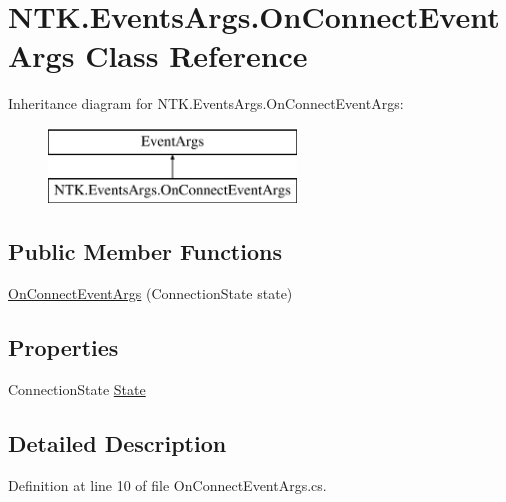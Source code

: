\hypertarget{class_n_t_k_1_1_events_args_1_1_on_connect_event_args}{}\section{N\+T\+K.\+Events\+Args.\+On\+Connect\+Event\+Args Class Reference}
\label{class_n_t_k_1_1_events_args_1_1_on_connect_event_args}
Inheritance diagram for N\+T\+K.\+Events\+Args.\+On\+Connect\+Event\+Args\+:\begin{figure}[H]
\begin{center}
\leavevmode
\includegraphics[height=2.000000cm]{d4/d56/class_n_t_k_1_1_events_args_1_1_on_connect_event_args}
\end{center}
\end{figure}
\subsection*{Public Member Functions}
\begin{DoxyCompactItemize}
\item 
\mbox{\hyperlink{class_n_t_k_1_1_events_args_1_1_on_connect_event_args_a8ee12a801fa6e27a3426cdfd44fd433b}{On\+Connect\+Event\+Args}} (Connection\+State state)
\end{DoxyCompactItemize}
\subsection*{Properties}
\begin{DoxyCompactItemize}
\item 
Connection\+State \mbox{\hyperlink{class_n_t_k_1_1_events_args_1_1_on_connect_event_args_a0ef5c46529b6983eef215ac3218fa488}{State}}
\end{DoxyCompactItemize}


\subsection{Detailed Description}


Definition at line 10 of file On\+Connect\+Event\+Args.\+cs.



